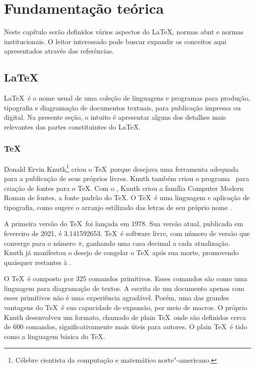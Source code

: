 \chapter{Fundamentação teórica}

Neste capítulo serão definidos vários aspectos do \LaTeX, normas \ac{abnt} e normas institucionais. O leitor interessado pode buscar expandir os conceitos aqui apresentados através das referências.

\section{\LaTeX}

\LaTeX\ é o nome usual de uma coleção de linguagens e programas para produção, tipografia e diagramação de documentos textuais, para publicação impressa ou digital. Na presente seção, o intuito é apresentar alguns dos detalhes mais relevantes das partes constituintes do \LaTeX.

\subsection{\TeX}

Donald Ervin Knuth\footnote{Célebre cientista da computação e matemático norte"-americano.} criou o \TeX\ porque desejava uma ferramenta adequada para a publicação de seus próprios livros. Knuth também criou o programa \MF\ para criação de fontes para o \TeX. Com o \MF, Knuth criou a família Computer Modern Roman de fontes, a fonte padrão do \TeX. O \TeX\ é uma linguagem e aplicação de tipografia, como sugere o arranjo estilizado das letras de seu próprio nome \cites{Knuth1986a,Knuth1986b,Knuth1986c,Knuth1986d,Knuth1986e}.

A primeira versão do \TeX\ foi lançada em 1978. Sua versão atual, publicada em fevereiro de 2021, é 3.141592653. \TeX\ é software livre, com número de versão que converge para o número \(\pi\), ganhando uma casa decimal a cada atualização. Knuth já manifestou o desejo de congelar o \TeX\ após sua morte, promovendo quaisquer  restantes à .

O \TeX\ é composto por 325 comandos primitivos. Esses comandos são como uma linguagem  para diagramação de textos. A escrita de um documento apenas com esses primitivos não é uma experiência agradável. Porém, uma das grandes vantagens do \TeX\ é sua capacidade de expansão, por meio de macros. O próprio Knuth desenvolveu um formato, chamado de plain \TeX\, onde são definidos cerca de 600 comandos, significativamente mais úteis para autores. O plain \TeX\ é tido como a linguagem básica do \TeX.

